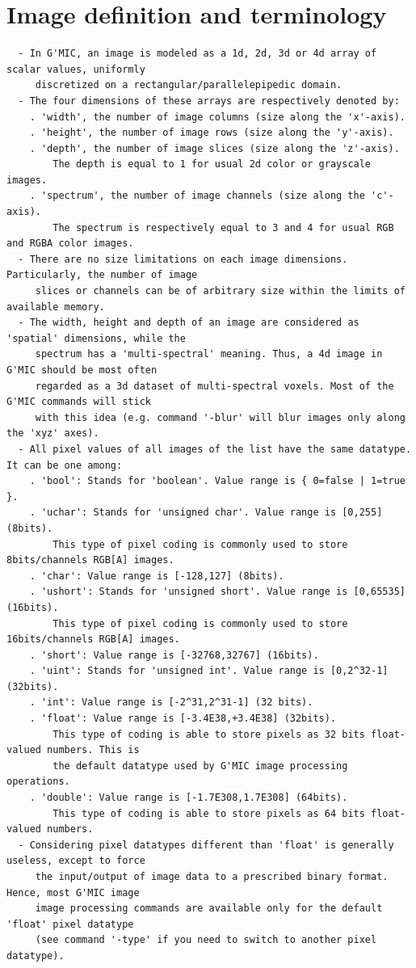 \documentclass[a4paper,11pt,twoside]{book}
\begin{document}
\section{Image definition and terminology}
\small
\begin{lstlisting}
  - In G'MIC, an image is modeled as a 1d, 2d, 3d or 4d array of scalar values, uniformly 
     discretized on a rectangular/parallelepipedic domain. 
  - The four dimensions of these arrays are respectively denoted by: 
    . 'width', the number of image columns (size along the 'x'-axis). 
    . 'height', the number of image rows (size along the 'y'-axis). 
    . 'depth', the number of image slices (size along the 'z'-axis). 
        The depth is equal to 1 for usual 2d color or grayscale images. 
    . 'spectrum', the number of image channels (size along the 'c'-axis). 
        The spectrum is respectively equal to 3 and 4 for usual RGB and RGBA color images. 
  - There are no size limitations on each image dimensions. Particularly, the number of image 
     slices or channels can be of arbitrary size within the limits of available memory. 
  - The width, height and depth of an image are considered as 'spatial' dimensions, while the 
     spectrum has a 'multi-spectral' meaning. Thus, a 4d image in G'MIC should be most often 
     regarded as a 3d dataset of multi-spectral voxels. Most of the G'MIC commands will stick 
     with this idea (e.g. command '-blur' will blur images only along the 'xyz' axes). 
  - All pixel values of all images of the list have the same datatype. It can be one among: 
    . 'bool': Stands for 'boolean'. Value range is { 0=false | 1=true }. 
    . 'uchar': Stands for 'unsigned char'. Value range is [0,255] (8bits). 
        This type of pixel coding is commonly used to store 8bits/channels RGB[A] images. 
    . 'char': Value range is [-128,127] (8bits). 
    . 'ushort': Stands for 'unsigned short'. Value range is [0,65535] (16bits). 
        This type of pixel coding is commonly used to store 16bits/channels RGB[A] images. 
    . 'short': Value range is [-32768,32767] (16bits). 
    . 'uint': Stands for 'unsigned int'. Value range is [0,2^32-1] (32bits). 
    . 'int': Value range is [-2^31,2^31-1] (32 bits). 
    . 'float': Value range is [-3.4E38,+3.4E38] (32bits). 
        This type of coding is able to store pixels as 32 bits float-valued numbers. This is 
        the default datatype used by G'MIC image processing operations. 
    . 'double': Value range is [-1.7E308,1.7E308] (64bits). 
        This type of coding is able to store pixels as 64 bits float-valued numbers. 
  - Considering pixel datatypes different than 'float' is generally useless, except to force 
     the input/output of image data to a prescribed binary format. Hence, most G'MIC image 
     image processing commands are available only for the default 'float' pixel datatype 
     (see command '-type' if you need to switch to another pixel datatype).
\end{lstlisting}
\normalsize
\end{document}
